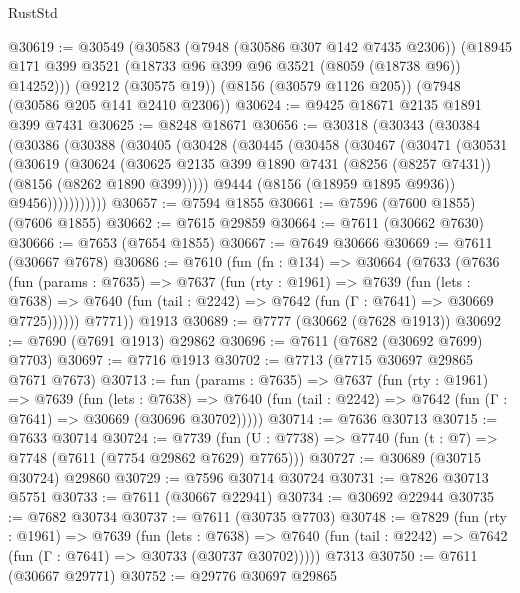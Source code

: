 \begin{lexlean}{RustStd}
\begin{coremodule}
@30619 := @30549
    (@30583
      (@7948 (@30586 @307 @142 @7435 @2306))
      (@18945 @171 @399 @3521 (@18733 @96 @399 @96 @3521 (@8059 (@18738 @96)) @14252)))
    (@9212 (@30575 @19))
    (@8156 (@30579 @1126 @205))
    (@7948 (@30586 @205 @141 @2410 @2306))
@30624 := @9425 @18671 @2135 @1891 @399 @7431
@30625 := @8248 @18671
@30656 := @30318
    (@30343
      (@30384
        (@30386
          (@30388
            (@30405
              (@30428
                (@30445
                  (@30458
                    (@30467
                      (@30471
                        (@30531
                          (@30619
                            (@30624
                              (@30625
                                @2135
                                @399
                                @1890
                                @7431
                                (@8256 (@8257 @7431))
                                (@8156 (@8262 @1890 @399)))))
                          @9444
                          (@8156 (@18959 @1895 @9936))
                          @9456)))))))))))
@30657 := @7594 @1855
@30661 := @7596 (@7600 @1855) (@7606 @1855)
@30662 := @7615 @29859
@30664 := @7611 (@30662 @7630)
@30666 := @7653 (@7654 @1855)
@30667 := @7649 @30666
@30669 := @7611 (@30667 @7678)
@30686 := @7610
    (fun (fn : @134) =>
    @30664
      (@7633
        (@7636
          (fun (params : @7635) =>
          @7637
            (fun (rty : @1961) =>
            @7639
              (fun (lets : @7638) =>
              @7640 (fun (tail : @2242) => @7642 (fun (Γ : @7641) => @30669 @7725))))))
        @7771))
    @1913
@30689 := @7777 (@30662 (@7628 @1913))
@30692 := @7690 (@7691 @1913) @29862
@30696 := @7611 (@7682 (@30692 @7699) @7703)
@30697 := @7716 @1913
@30702 := @7713 (@7715 @30697 @29865 @7671 @7673)
@30713 := fun (params : @7635) =>
  @7637
    (fun (rty : @1961) =>
    @7639
      (fun (lets : @7638) =>
      @7640 (fun (tail : @2242) => @7642 (fun (Γ : @7641) => @30669 (@30696 @30702)))))
@30714 := @7636 @30713
@30715 := @7633 @30714
@30724 := @7739
    (fun (U : @7738) => @7740 (fun (t : @7) => @7748 (@7611 (@7754 @29862 @7629) @7765)))
@30727 := @30689 (@30715 @30724) @29860
@30729 := @7596 @30714 @30724
@30731 := @7826 @30713 @5751
@30733 := @7611 (@30667 @22941)
@30734 := @30692 @22944
@30735 := @7682 @30734
@30737 := @7611 (@30735 @7703)
@30748 := @7829
    (fun (rty : @1961) =>
    @7639
      (fun (lets : @7638) =>
      @7640 (fun (tail : @2242) => @7642 (fun (Γ : @7641) => @30733 (@30737 @30702)))))
    @7313
@30750 := @7611 (@30667 @29771)
@30752 := @29776 @30697 @29865

\end{coremodule}
\end{lexlean}
